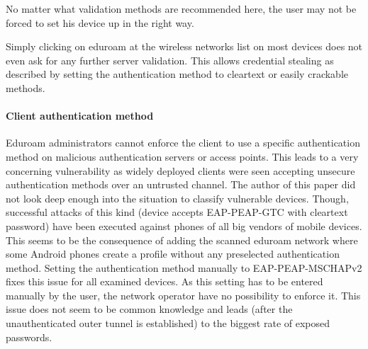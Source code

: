 \documentclass[12pt,a4paper]{scrartcl}
\begin{document}
No matter what validation methods are recommended here, the user may not be forced to set his device up in the right way.

Simply clicking on eduroam at the wireless networks list on most devices does not even ask for any further server validation.
This allows credential stealing as described by setting the authentication method to cleartext or easily crackable methods.


\paragraph{Client authentication method}
Eduroam administrators cannot enforce the client to use a specific authentication method on malicious authentication servers or access points.
This leads to a very concerning vulnerability as widely deployed clients were seen accepting unsecure authentication methods over an untrusted channel.
The author of this paper did not look deep enough into the situation to classify vulnerable devices.
Though, successful attacks of this kind (device accepts EAP-PEAP-GTC with cleartext password) have been executed against phones of all big vendors of mobile devices.
This seems to be the consequence of adding the scanned eduroam network where some Android phones create a profile without any preselected authentication method.
Setting the authentication method manually to EAP-PEAP-MSCHAPv2 fixes this issue for all examined devices.
As this setting has to be entered manually by the user, the network operator have no possibility to enforce it.
This issue does not seem to be common knowledge and leads (after the unauthenticated outer tunnel is established) to the biggest rate of exposed passwords.
\end{document}
